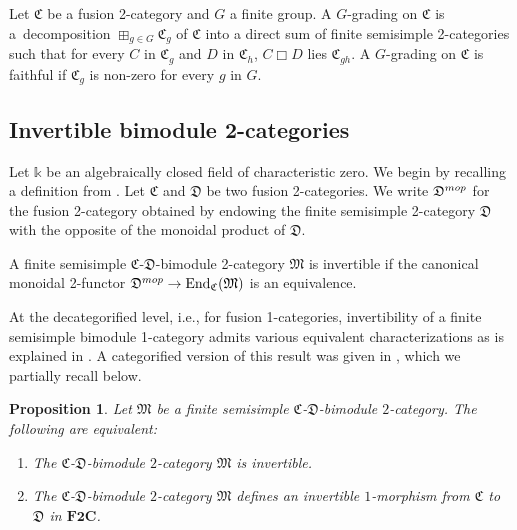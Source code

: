 \documentclass[11pt]{article}
\numberwithin{equation}{section}
\newtheorem{Proposition}[Theorem]{Proposition}
{ \theoremstyle{definition}
\newtheorem{Definition}[Theorem]{Definition}
\newtheorem{Note}[Theorem]{Note}
\newtheorem{Construction}[Theorem]{Construction}
\newtheorem{Example}[Theorem]{Example}
\newtheorem{Remark}[Theorem]{Remark} }
\numberwithin{equation}{section}
\begin{document}
\begin{Definition}
Let $\mathfrak{C}$ be a fusion 2-category and $G$ a finite group. A $G$-grading on $\mathfrak{C}$ is a~decomposition $\boxplus_{g\in G}\mathfrak{C}_g$ of $\mathfrak{C}$ into a direct sum of finite semisimple 2-categories such that for every $C$ in $\mathfrak{C}_g$ and $D$ in $\mathfrak{C}_h$, $C\Box D$ lies $\mathfrak{C}_{gh}$. A $G$-grading on $\mathfrak{C}$ is faithful if $\mathfrak{C}_g$ is non-zero for every $g$ in $G$.
\end{Definition}

\subsection{Invertible bimodule 2-categories}

Let $\mathds{k}$ be an algebraically closed field of characteristic zero. We begin by recalling a definition from \cite{DY23}. Let $\mathfrak{C}$ and $\mathfrak{D}$ be two fusion 2-categories. We write $\mathfrak{D}^{\rm mop}$ for the fusion 2-category obtained by endowing the finite semisimple 2-category $\mathfrak{D}$ with the opposite of the monoidal product of $\mathfrak{D}$.

\begin{Definition}
A finite semisimple $\mathfrak{C}$-$\mathfrak{D}$-bimodule 2-category $\mathfrak{M}$ is invertible if the canonical monoidal 2-functor $\mathfrak{D}^{\rm mop}\rightarrow \mathbf{\operatorname{End}}_{\mathfrak{C}}(\mathfrak{M})$ is an equivalence.
\end{Definition}

At the decategorified level, i.e., for fusion 1-categories, invertibility of a finite semisimple bimodule 1-category admits various equivalent characterizations as is explained in \cite[Proposition~4.2]{ENO2}. A categorified version of this result was given in \cite{D10}, which we partially recall below.

\begin{Proposition}\label{prop:invertibilitycharacterization}
Let $\mathfrak{M}$ be a finite semisimple $\mathfrak{C}$-$\mathfrak{D}$-bimodule $2$-category. The following are equivalent:
\begin{enumerate}\itemsep=0pt
 \item[$(1)$] The $\mathfrak{C}$-$\mathfrak{D}$-bimodule $2$-category $\mathfrak{M}$ is invertible.
 \item[$(2)$] The $\mathfrak{C}$-$\mathfrak{D}$-bimodule $2$-category $\mathfrak{M}$ defines an invertible $1$-morphism from $\mathfrak{C}$ to $\mathfrak{D}$ in $\mathbf{F2C}$.
\end{enumerate}
\end{Proposition}
\end{document}
